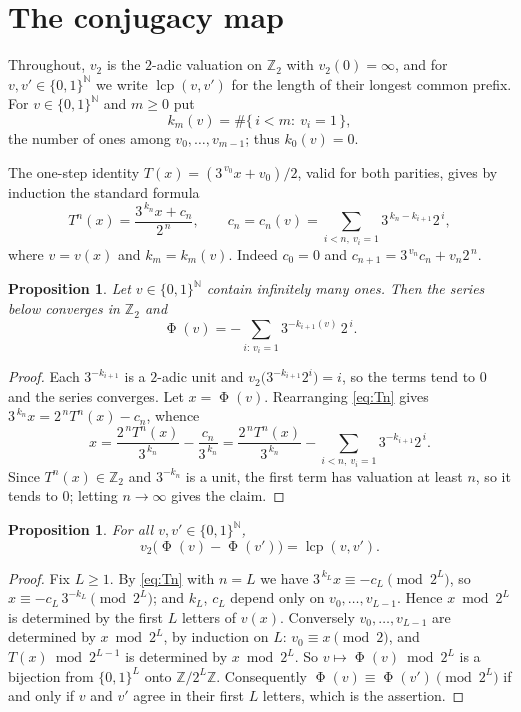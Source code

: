 \documentclass[11pt,reqno]{amsart}
\theoremstyle{plain}
\newtheorem{proposition}[theorem]{Proposition}
\theoremstyle{definition}
\newcommand{\Zt}{\mathbb{Z}_2}
\newcommand{\Z}{\mathbb{Z}}
\newcommand{\N}{\mathbb{N}}
\newcommand{\vt}{v_2}
\newcommand{\lcp}{\operatorname{lcp}}
\DeclareMathOperator{\Ph}{\Phi}
\begin{document}
\section{The conjugacy map}\label{sec:phi}

Throughout, $\vt$ is the $2$-adic valuation on $\Zt$ with $\vt(0)=\infty$, and
for $v,v'\in\{0,1\}^{\N}$ we write $\lcp(v,v')$ for the length of their longest
common prefix. For $v\in\{0,1\}^{\N}$ and $m\ge 0$ put
\[
k_m(v)=\#\{\,i<m:\ v_i=1\,\},
\]
the number of ones among $v_0,\dots,v_{m-1}$; thus $k_0(v)=0$.

The one-step identity $T(x)=(3^{\,v_0}x+v_0)/2$, valid for both parities, gives by
induction the standard formula
\begin{equation}\label{eq:Tn}
T^n(x)=\frac{3^{\,k_n}x+c_n}{2^{\,n}},\qquad
c_n=c_n(v)=\!\!\sum_{i<n,\ v_i=1}\!\! 3^{\,k_n-k_{i+1}}2^{\,i},
\end{equation}
where $v=v(x)$ and $k_m=k_m(v)$. Indeed $c_0=0$ and
$c_{n+1}=3^{\,v_n}c_n+v_n2^{\,n}$.

\begin{proposition}\label{prop:closed}
Let $v\in\{0,1\}^{\N}$ contain infinitely many ones. Then the series below
converges in $\Zt$ and
\[
\Ph(v)=-\sum_{i:\,v_i=1} 3^{-k_{i+1}(v)}\,2^{\,i}.
\]
\end{proposition}

\begin{proof}
Each $3^{-k_{i+1}}$ is a $2$-adic unit and $\vt\bigl(3^{-k_{i+1}}2^i\bigr)=i$, so
the terms tend to $0$ and the series converges. Let $x=\Ph(v)$. Rearranging
\eqref{eq:Tn} gives $3^{\,k_n}x=2^{\,n}T^n(x)-c_n$, whence
\[
x=\frac{2^{\,n}T^n(x)}{3^{\,k_n}}-\frac{c_n}{3^{\,k_n}}
 =\frac{2^{\,n}T^n(x)}{3^{\,k_n}}-\sum_{i<n,\ v_i=1}3^{-k_{i+1}}2^{\,i}.
\]
Since $T^n(x)\in\Zt$ and $3^{-k_n}$ is a unit, the first term has valuation at
least $n$, so it tends to $0$; letting $n\to\infty$ gives the claim.
\end{proof}

\begin{proposition}\label{prop:isometry}
For all $v,v'\in\{0,1\}^{\N}$,
\[
\vt\bigl(\Ph(v)-\Ph(v')\bigr)=\lcp(v,v').
\]
\end{proposition}

\begin{proof}
Fix $L\ge 1$. By \eqref{eq:Tn} with $n=L$ we have
$3^{\,k_L}x\equiv -c_L \pmod{2^{L}}$, so
$x\equiv -c_L\,3^{-k_L}\pmod{2^{L}}$; and $k_L$, $c_L$ depend only on
$v_0,\dots,v_{L-1}$. Hence $x\bmod 2^{L}$ is determined by the first $L$ letters
of $v(x)$. Conversely $v_0,\dots,v_{L-1}$ are determined by $x\bmod 2^{L}$, by
induction on $L$: $v_0\equiv x\pmod 2$, and $T(x)\bmod 2^{L-1}$ is determined by
$x \bmod 2^{L}$. So $v\mapsto \Ph(v)\bmod 2^{L}$ is a bijection from
$\{0,1\}^{L}$ onto $\Z/2^{L}\Z$. Consequently
$\Ph(v)\equiv\Ph(v')\pmod{2^{L}}$ if and only if $v$ and $v'$ agree in their
first $L$ letters, which is the assertion.
\end{proof}
\end{document}
